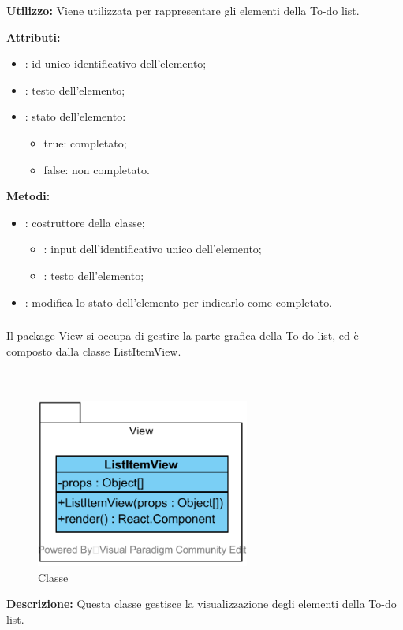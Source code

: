 \textbf{Utilizzo:}
Viene utilizzata per rappresentare gli elementi della To-do list.

\textbf{Attributi:}
\begin{itemize}
	\item {}: id unico identificativo dell'elemento;
	\item {}: testo dell'elemento;
	\item {}: stato dell'elemento: 
	\begin{itemize}
		\item true: completato;
		\item false: non completato.
	\end{itemize}
\end{itemize}

\textbf{Metodi:}
\begin{itemize}
	\item {}: costruttore della classe;
	\begin{itemize}
		\item {}: input dell'identificativo unico dell'elemento;
		\item {}: testo dell'elemento;
	\end{itemize}
	\item {}: modifica lo stato dell'elemento per indicarlo come completato.
\end{itemize}

\subsubsection[::View]{\class} \label{\class}
Il package View si occupa di gestire la parte grafica della To-do list, ed è composto dalla classe ListItemView.

\paragraph[::ListItemView]{\class}\mbox{}\\ \label{\class}
\begin{figure}[H]
	\centering
	\includegraphics[width=7cm]{./diagrammi/todo/todoview.png}
	\caption{Classe \class}
\end{figure}
\textbf{Descrizione:}
Questa classe gestisce la visualizzazione degli elementi della To-do list.

